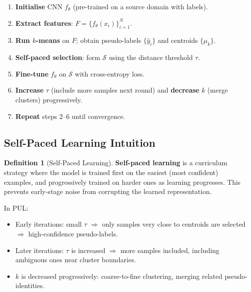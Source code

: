 \documentclass[11pt,a4paper]{article}
\theoremstyle{definition}
\newtheorem{definition}{Definition}[section]
\theoremstyle{plain}
\theoremstyle{remark}
\begin{document}
\begin{tcolorbox}[colback=gray!5!white,colframe=gray!60!black,title=\textbf{Algorithm: Progressive Unsupervised Learning}]
\begin{enumerate}
    \item \textbf{Initialise} CNN $f_\theta$ (pre-trained on a source domain with labels).
    \item \textbf{Extract features}: $F = \{f_\theta(x_i)\}_{i=1}^N$.
    \item \textbf{Run $k$-means} on $F$; obtain pseudo-labels $\{\hat{y}_i\}$ and centroids $\{\mu_k\}$.
    \item \textbf{Self-paced selection}: form $\mathcal{S}$ using the distance threshold $\tau$.
    \item \textbf{Fine-tune} $f_\theta$ on $\mathcal{S}$ with cross-entropy loss.
    \item \textbf{Increase} $\tau$ (include more samples next round) and \textbf{decrease} $k$ (merge clusters) progressively.
    \item \textbf{Repeat} steps 2--6 until convergence.
\end{enumerate}
\end{tcolorbox}

\subsection{Self-Paced Learning Intuition}

\begin{definition}[Self-Paced Learning]
\textbf{Self-paced learning} is a curriculum strategy where the model is trained first on the easiest (most confident) examples, and progressively trained on harder ones as learning progresses. This prevents early-stage noise from corrupting the learned representation.
\end{definition}

In PUL:
\begin{itemize}
    \item Early iterations: small $\tau$ $\Rightarrow$ only samples very close to centroids are selected $\Rightarrow$ high-confidence pseudo-labels.
    \item Later iterations: $\tau$ is increased $\Rightarrow$ more samples included, including ambiguous ones near cluster boundaries.
    \item $k$ is decreased progressively: coarse-to-fine clustering, merging related pseudo-identities.
\end{itemize}
\end{document}
